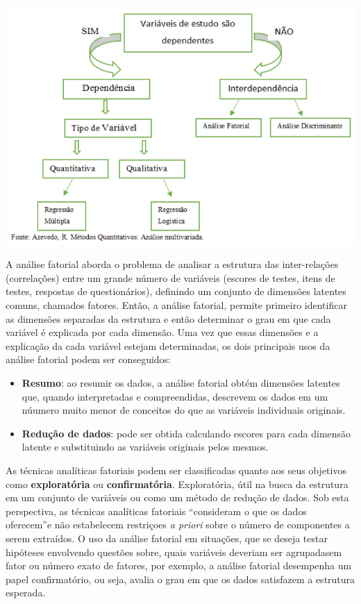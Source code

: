 \documentclass[12pt,brazil,]{book}
\begin{document}
\includegraphics{anfat1.png}

A análise fatorial aborda o problema de analisar a estrutura das
inter-relações (correlações) entre um grande número de variáveis
(escores de testes, itens de testes, respostas de questionários),
definindo um conjunto de dimensões latentes comuns, chamados fatores.
Então, a análise fatorial, permite primeiro identificar as dimensões
separadas da estrutura e então determinar o grau em que cada variável é
explicada por cada dimensão. Uma vez que essas dimensões e a explicação
da cada variável estejam determinadas, os dois principais usos da
análise fatorial podem ser conseguidos:

\begin{itemize}
\item
  \textbf{Resumo}: ao resumir os dados, a análise fatorial obtém
  dimensões latentes que, quando interpretadas e compreendidas,
  descrevem os dados em um núumero muito menor de conceitos do que as
  variáveis individuais originais.
\item
  \textbf{Redução de dados}: pode ser obtida calculando escores para
  cada dimensão latente e substituindo as variáveis originais pelos
  mesmos.
\end{itemize}

As técnicas analíticas fatoriais podem ser classificadas quanto aos seus
objetivos como \textbf{exploratória} ou \textbf{confirmatória}.
Exploratória, útil na busca da estrutura em um conjunto de variáveis ou
como um método de redução de dados. Sob esta perspectiva, as técnicas
analíticas fatoriais ``consideram o que os dados oferecem''e não
estabelecem restriçoes \emph{a priori} sobre o número de componentes a
serem extraídos. O uso da análise fatorial em situações, que se deseja
testar hipóteses envolvendo questões sobre, quais variáveis deveriam ser
agrupadasem fator ou número exato de fatores, por exemplo, a análise
fatorial desempenha um papel confirmatório, ou seja, avalia o grau em
que os dados satisfazem a estrutura esperada.
\end{document}

